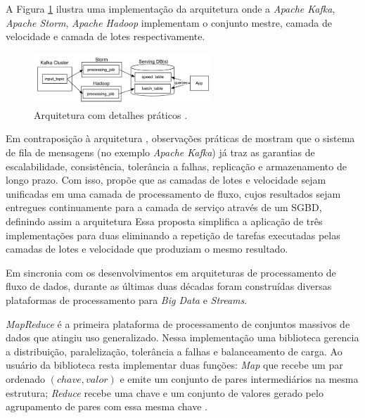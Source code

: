 A Figura \ref{fig:lambda} ilustra uma implementação da arquitetura \lambdaa
onde a \emph{Apache Kafka}, \emph{Apache Storm}, \emph{Apache Hadoop}
implementam o conjunto mestre, camada de velocidade e camada de lotes
respectivamente.

\begin{figure}[ht]
\centering
\includegraphics[width=0.6\textwidth]{figuras/lambda.png}
\caption{Arquitetura \lambdaa com detalhes práticos \cite{Kreps2014}.}
\label{fig:lambda}
\end{figure}

Em contraposição à arquitetura \lambdaa, observações práticas de 
 mostram que o sistema de fila de mensagens
(no exemplo \emph{Apache Kafka}) já traz as garantias de
escalabilidade, consistência, tolerância a falhas, replicação e armazenamento de longo prazo.
Com isso,  propõe que as camadas de lotes e velocidade sejam
unificadas em uma camada de processamento de fluxo, cujos resultados sejam entregues
continuamente para a camada de serviço através de um SGBD, definindo assim a arquitetura \kappaa
Essa proposta simplifica a aplicação de três implementações para duas eliminando a
repetição de tarefas executadas pelas camadas de lotes e velocidade que
produziam o mesmo resultado.



Em sincronia com os desenvolvimentos em arquiteturas de processamento de fluxo de dados,
durante as últimas duas décadas foram construídas diversas plataformas de
processamento para \emph{Big Data} e \emph{Streams}.

\emph{MapReduce} é a primeira plataforma de processamento de conjuntos massivos
de dados que atingiu uso generalizado.
Nessa implementação uma biblioteca
gerencia a distribuição, paralelização, tolerância a falhas e balanceamento de
carga.
Ao usuário da biblioteca resta implementar duas funções:
\emph{Map} que recebe um par ordenado
$(chave, valor)$ e emite um conjunto de pares intermediários na mesma estrutura;
\emph{Reduce} recebe uma chave e um conjunto de valores gerado pelo agrupamento
de pares com essa mesma chave \cite{Dean2004}.

